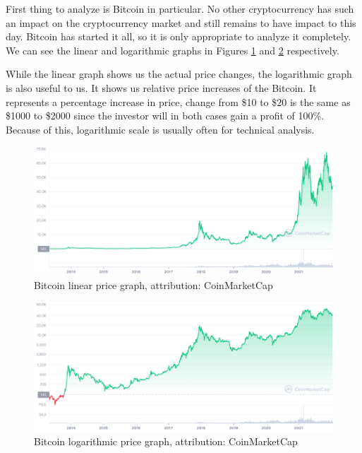 First thing to analyze is Bitcoin in particular. No other cryptocurrency has such an impact on the cryptocurrency market and still remains to have impact to this day. Bitcoin has started it all, so it is only appropriate to analyze it completely. We can see the linear and logarithmic graphs in Figures \ref{btc-linear-figure} and \ref{btc-log-figure} respectively.

While the linear graph shows us the actual price changes, the logarithmic graph is also useful to us. It shows us relative price increases of the Bitcoin. It represents a percentage increase in price, change from \$10 to \$20 is the same as \$1000 to \$2000 since the investor will in both cases gain a profit of 100\%. Because of this, logarithmic scale is usually often for technical analysis.

\begin{figure}[ht]
    \centering
    \includegraphics[width=\columnwidth]{figures/BTC_ALL_linear.png}
    \caption{Bitcoin linear price graph, attribution: CoinMarketCap \cite{coinmarketcap}}
    \label{btc-linear-figure}
\end{figure}

\begin{figure}[ht]
    \centering
    \includegraphics[width=\columnwidth]{figures/BTC_ALL_log.png}
    \caption{Bitcoin logarithmic price graph, attribution: CoinMarketCap \cite{coinmarketcap}}
    \label{btc-log-figure}
\end{figure}

